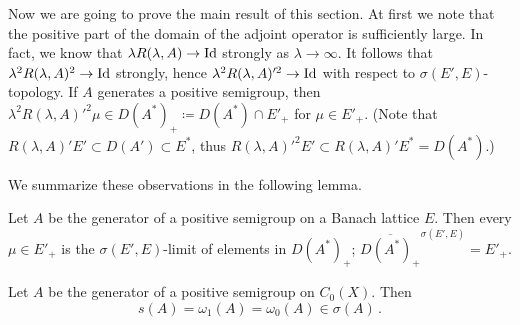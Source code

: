 Now we are going to prove the main result of this section. 
At first we note that the positive part of the domain of the adjoint operator is sufficiently large. 
In fact, we know that $\lambda R(\lambda,A) \to \operatorname{Id} $ strongly as $\lambda \to \infty$. 
It follows that $\lambda^2R(\lambda,A)^2 \to \operatorname{Id} $ strongly, hence $\lambda^2R(\lambda,A)'^2 \to \operatorname{Id} $ with respect to $\sigma(E',E)$-topology. 
If $A$ generates a positive semigroup, then $\lambda^2R(\lambda,A)'^2\mu \in D(A^*)_{+} \coloneq D(A^*)\cap E'_{+}$ for $\mu \in E'_+$. 
(Note that $R(\lambda,A)'E' \subset D(A') \subset E^*$, thus $R(\lambda,A)'^2E' \subset R(\lambda,A)'E^* = D(A^*)$.)

We summarize these observations in the following lemma.

\begin{lemma}\label{lem:b4-1.3}
Let $A$ be the generator of a positive semigroup on a Banach lattice $E$. Then every $\mu \in E'_+$ is the $\sigma(E',E)$-limit of elements in $D(A^*)_{+}$; \ie $\overline{D(A^*)_+}^{\sigma(E',E)} = E'_+$.
\end{lemma}

\begin{theorem}\label{thm:b4-1.4}
Let $A$ be the generator of a positive semigroup on $C_{0}(X)$. 
Then
\[
   s(A) = \omega_1(A) = \omega_{0}(A) \in \sigma(A)\,.
\]
\end{theorem}

